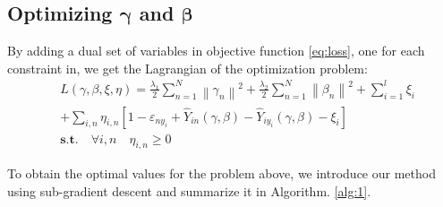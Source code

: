 \subsection{Optimizing $\boldsymbol{\gamma}$ and $\boldsymbol{\beta}$}
By adding a dual set of variables in objective function \eqref{eq:loss}, one for each constraint in, we get the Lagrangian of the optimization problem:
\begin{equation}\label{eq:dual}
\begin{aligned}
 &L\left( {\gamma ,\beta ,\xi ,\eta } \right) =
 \frac{{{\lambda _1}}}{2}\sum\limits_{n = 1}^N {{{\left\| {{\gamma _n}} \right\|}^2}}  + \frac{{{\lambda _2}}}{2}\sum\limits_{n = 1}^N {{{\left\| {{\beta _n}} \right\|}^2}}  + \sum\limits_{i = 1}^l {{\xi _i}} \\
   &+ \sum\limits_{i,n} {{\eta _{i,n}}\left[ {1 - {\varepsilon _{n{y_i}}} + {{\hat Y}_{in}}\left( {\gamma ,\beta } \right) - {{\hat Y}_{i{y_i}}}\left( {\gamma ,\beta } \right) - {\xi _i}} \right]}  \\
 &\textbf{s.t.} \quad  \forall i,n \quad {} {\eta _{i,n}} \ge 0
\end{aligned}
\end{equation}

To obtain the optimal values for the problem above, we introduce our method using sub-gradient descent \cite{BoydCO} and summarize it in Algorithm. \ref{alg:1}. 


